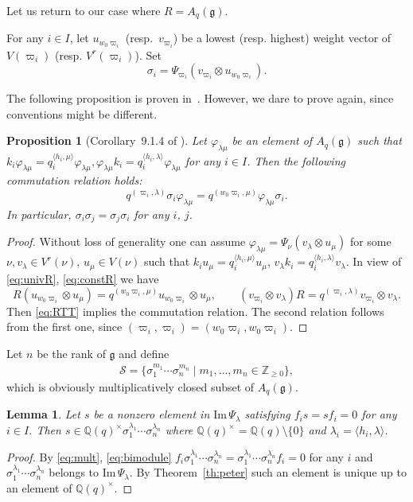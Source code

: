 \documentclass[11pt]{article}
\newtheorem{lemma}{Lemma}
\newtheorem{proposition}{Proposition}
\newcommand{\geh}{\mathfrak{g}}
\newcommand{\la}{\lambda}
\newcommand{\ot}{\otimes}
\newcommand{\pair}[1]{\langle{#1}\rangle}
\newcommand{\Z}{{\mathbb Z}}
\newcommand{\Q}{{\mathbb Q}}
\begin{document}
Let us return to our case where $R=A_q(\geh)$.
%
\begin{definition}\label{def:sigma}
For any $i \in I$, let $u_{w_0\varpi_i}$ (resp.~$v_{\varpi_i}$) be a lowest (resp. highest) weight vector
of $V(\varpi_i)$ (resp. $V^r(\varpi_i)$). Set
\[
\sigma_i=\Psi_{\varpi_i}(v_{\varpi_i}\ot u_{w_0\varpi_i}).
\]
\end{definition}

The following proposition is proven in~\cite{Joseph}. However, we dare to prove again, since conventions
might be dif\/ferent.

\begin{proposition}[Corollary~9.1.4 of \cite{Joseph}] \label{pr:q-comm}
Let $\varphi_{\la\mu}$ be an element of $A_q(\geh)$ such that $k_i\varphi_{\la\mu}=
q_i^{\pair{h_i,\mu}}\varphi_{\la\mu},\varphi_{\la\mu}k_i=q_i^{\pair{h_i,\la}}\varphi_{\la\mu}$
for any $i \in I$. Then the following commutation relation holds:
\[
q^{(\varpi_i,\la)}\sigma_i\varphi_{\la\mu}=q^{(w_0\varpi_i,\mu)}\varphi_{\la\mu}\sigma_i.
\]
In particular, $\sigma_i\sigma_j=\sigma_j\sigma_i$ for any $i$, $j$.
\end{proposition}

\begin{proof}
Without loss of generality one can assume $\varphi_{\la\mu}=\Psi_\nu(v_\la\ot u_\mu)$ for some
$\nu,v_\la\in V^r(\nu)$, $u_\mu\in V(\nu)$ such that $k_iu_\mu=q_i^{\pair{h_i,\mu}}u_\mu$,
$v_\la k_i=q_i^{\pair{h_i,\la}}v_\la$. In view of \eqref{eq:univR}, \eqref{eq:constR} we have
\[
R(u_{w_0\varpi_i}\ot u_\mu)=q^{(w_0\varpi_i,\mu)}u_{w_0\varpi_i}\ot u_\mu,\qquad
(v_{\varpi_i}\ot v_\la)R=q^{(\varpi_i,\la)}v_{\varpi_i}\ot v_\la.
\]
Then \eqref{eq:RTT} implies the commutation relation.
The second relation follows from the f\/irst one, since $(\varpi_i,\varpi_i)
=(w_0\varpi_i,w_0\varpi_i)$.
\end{proof}

Let $n$ be the rank of $\geh$ and def\/ine
\begin{gather*}
\mathcal{S}=\big\{\sigma_1^{m_1}\cdots\sigma_n^{m_n}\mid m_1,\ldots,m_n\in\Z_{\ge0}\big\},
\end{gather*}
which is obviously multiplicatively closed subset of $A_q(\geh)$.

\begin{lemma}\label{le:ff}
Let $s$ be a nonzero element in $\mathrm{Im}\,\Psi_\la$
satisfying $f_is=sf_i=0$ for any $i \in I$.
Then $s\in\Q(q)^\times\sigma_1^{\la_1}\cdots\sigma_n^{\la_n}$
where $\Q(q)^\times=\Q(q)\setminus\{0\}$ and
$\la_i=\pair{h_i,\la}$.
\end{lemma}
%
\begin{proof}
By \eqref{eq:mult}, \eqref{eq:bimodule} $f_i\sigma_1^{\la_1}\cdots\sigma_n^{\la_n}
=\sigma_1^{\la_1}\cdots\sigma_n^{\la_n}f_i=0$ for any $i$ and $\sigma_1^{\la_1}\cdots\sigma_n^{\la_n}$
belongs to $\mathrm{Im}\,\Psi_\la$. By Theorem~\ref{th:peter} such an element is unique up to an element
of $\Q(q)^\times$.
\end{proof}
\end{document}
